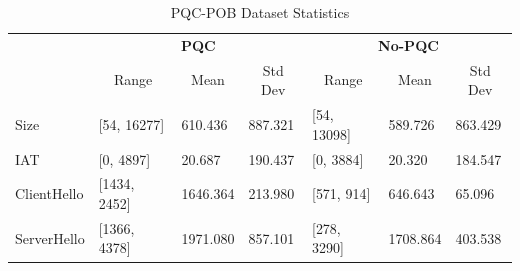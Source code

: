 \documentclass[10pt,journal]{IEEEtran}%
\begin{document}
\begin{table}[h]
\centering
\caption{PQC-POB Dataset Statistics}
\label{tab:pob-stats}
\begin{tabular}{l|lll|lll|}
\cline{2-7}
                                  & \multicolumn{3}{c|}{\textbf{PQC}}                                                                         & \multicolumn{3}{c|}{\textbf{No-PQC}}                                                                     \\ \cline{2-7} 
                                  & \multicolumn{1}{c|}{Range}            & \multicolumn{1}{c|}{Mean}     & \multicolumn{1}{c|}{Std Dev} & \multicolumn{1}{c|}{Range}           & \multicolumn{1}{c|}{Mean}     & \multicolumn{1}{c|}{Std Dev} \\ \hline
\multicolumn{1}{|l|}{Size}        & \multicolumn{1}{l|}{{[}54, 16277{]}}  & \multicolumn{1}{l|}{610.436}  & 887.321                  & \multicolumn{1}{l|}{{[}54, 13098{]}} & \multicolumn{1}{l|}{589.726}  & 863.429                  \\ \hline
\multicolumn{1}{|l|}{IAT}         & \multicolumn{1}{l|}{{[}0, 4897{]}}    & \multicolumn{1}{l|}{20.687}   & 190.437                  & \multicolumn{1}{l|}{{[}0, 3884{]}}   & \multicolumn{1}{l|}{20.320}   & 184.547                  \\ \hline
\multicolumn{1}{|l|}{ClientHello} & \multicolumn{1}{l|}{{[}1434, 2452{]}} & \multicolumn{1}{l|}{1646.364} & 213.980                  & \multicolumn{1}{l|}{{[}571, 914{]}}  & \multicolumn{1}{l|}{646.643}  & 65.096                   \\ \hline
\multicolumn{1}{|l|}{ServerHello} & \multicolumn{1}{l|}{{[}1366, 4378{]}} & \multicolumn{1}{l|}{1971.080} & 857.101                  & \multicolumn{1}{l|}{{[}278, 3290{]}} & \multicolumn{1}{l|}{1708.864} & 403.538                  \\ \hline
\end{tabular}
\end{table}
\end{document}
